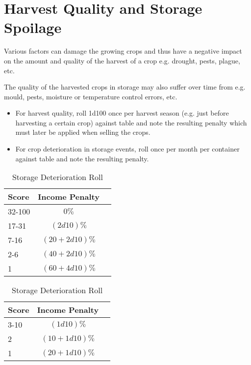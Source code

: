 \documentclass[a4paper,10pt]{article}
\begin{document}
\section{Harvest Quality and Storage Spoilage}
Various factors can damage the growing crops and thus have a negative impact on
the amount and quality of the harvest of a crop e.g. drought, pests, plague,
etc.

The quality of the harvested crops in storage may also suffer over time from
e.g. mould, pests, moisture or temperature control errors, etc.

\begin{itemize}
\item For harvest quality, roll 1d100 once per harvest season (e.g. just before
  harvesting a certain crop) against table
   and note the resulting penalty which
  must later be applied when selling the crops.
\item For crop deterioration in storage events, roll once per month per
  container against table  and note
  the resulting penalty.
\end{itemize}


\begin{table}
\begin{minipage}{0.5\textwidth}
\begin{center}
  \caption{Harvest Quality Roll}
  \begin{tabular}{lcc}
    \toprule
    Score  & Income Penalty \\
    \midrule
    32-100 & $0\%$          \\
    17-31  & $(2d10)\%$     \\
    7-16   & $(20 + 2d10)\%$\\
    2-6    & $(40 + 2d10)\%$\\
    1      & $(60 + 4d10)\%$\\
    \bottomrule
  \end{tabular}
  \label{tab:harvestQualityRolls}
\end{center}
\end{minipage}%
%
\begin{minipage}{0.5\textwidth}
\begin{center}
  \caption{Storage Deterioration Roll}
  \begin{tabular}{lcc}
    \toprule
    Score  & Income Penalty \\
    \midrule
    3-10   & $(1d10)\%$\\
    2      & $(10 + 1d10)\%$\\
    1      & $(20 + 1d10)\%$\\
    \bottomrule
  \end{tabular}
  \label{tab:storageDeteriorationRolls}
\end{center}
\end{minipage}
\end{table}
\end{document}
